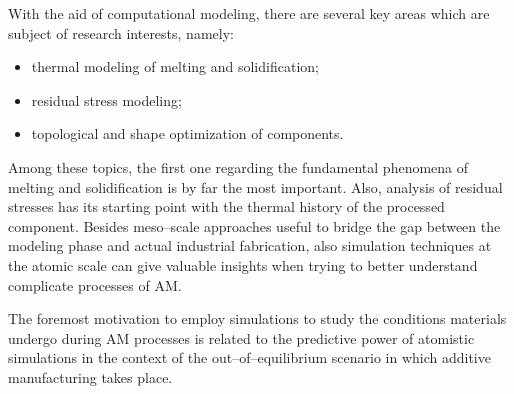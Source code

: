 With the aid of computational modeling, there are several key areas which are subject of research interests, namely:
\begin{itemize}
    \item thermal modeling of melting and solidification;
    \item residual stress modeling;
    \item topological and shape optimization of components.
\end{itemize}

Among these topics, the first one regarding the fundamental phenomena of melting and solidification is by far the most important. Also, analysis of residual stresses has its starting point with the thermal history of the processed component.
Besides meso--scale approaches useful to bridge the gap between the modeling phase and actual industrial fabrication, also simulation techniques at the atomic scale can give valuable insights when trying to better understand complicate processes of AM.


The foremost motivation to employ simulations to study the conditions materials undergo during AM processes is related to the predictive power of atomistic simulations in the context of the out--of--equilibrium scenario in which additive manufacturing takes place.


